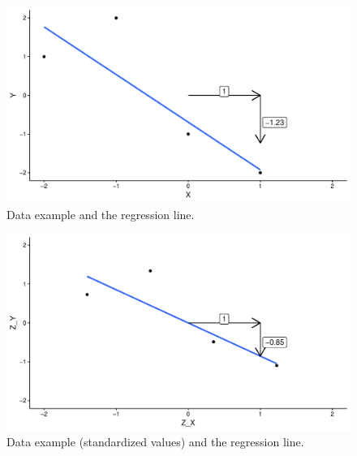 \documentclass[]{book}\usepackage[]{graphicx}\usepackage[]{color}
\makeatletter
\def\maxwidth{ %
  \ifdim\Gin@nat@width>\linewidth
    \linewidth
  \else
    \Gin@nat@width
  \fi
}
\newenvironment{knitrout}{}{} %
\makeatother
\begin{document}
\begin{knitrout}
\color{fgcolor}\begin{figure}

{\centering \includegraphics[width=\maxwidth]{figure/lm_cov1-1} 

}

\caption[Data example and the regression line]{Data example and the regression line.}\label{fig:lm_cov1}
\end{figure}


\end{knitrout}

\begin{knitrout}
\color{fgcolor}\begin{figure}

{\centering \includegraphics[width=\maxwidth]{figure/lm_cov2-1} 

}

\caption[Data example (standardized values) and the regression line]{Data example (standardized values) and the regression line.}\label{fig:lm_cov2}
\end{figure}


\end{knitrout}
\end{document}
